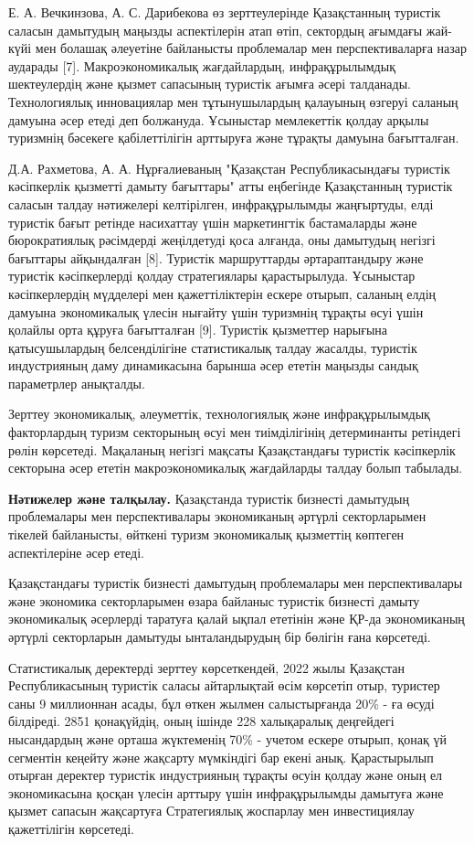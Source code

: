 Е. А. Вечкинзова, А. С. Дарибекова өз зерттеулерінде Қазақстанның
туристік саласын дамытудың маңызды аспектілерін атап өтіп, сектордың
ағымдағы жай-күйі мен болашақ әлеуетіне байланысты проблемалар мен
перспективаларға назар аударады {[}7{]}. Макроэкономикалық жағдайлардың,
инфрақұрылымдық шектеулердің және қызмет сапасының туристік ағымға әсері
талданады. Технологиялық инновациялар мен тұтынушылардың қалауының
өзгеруі саланың дамуына әсер етеді деп болжануда. Ұсыныстар мемлекеттік
қолдау арқылы туризмнің бәсекеге қабілеттілігін арттыруға және тұрақты
дамуына бағытталған.

Д.А. Рахметова, А. А. Нұрғалиеваның "Қазақстан Республикасындағы
туристік кәсіпкерлік қызметті дамыту бағыттары" атты еңбегінде
Қазақстанның туристік саласын талдау нәтижелері келтірілген,
инфрақұрылымды жаңғыртуды, елді туристік бағыт ретінде насихаттау үшін
маркетингтік бастамаларды және бюрократиялық рәсімдерді жеңілдетуді қоса
алғанда, оны дамытудың негізгі бағыттары айқындалған {[}8{]}. Туристік
маршруттарды әртараптандыру және туристік кәсіпкерлерді қолдау
стратегиялары қарастырылуда. Ұсыныстар кәсіпкерлердің мүдделері мен
қажеттіліктерін ескере отырып, саланың елдің дамуына экономикалық үлесін
нығайту үшін туризмнің тұрақты өсуі үшін қолайлы орта құруға бағытталған
{[}9{]}. Туристік қызметтер нарығына қатысушылардың белсенділігіне
статистикалық талдау жасалды, туристік индустрияның даму динамикасына
барынша әсер ететін маңызды сандық параметрлер анықталды.

Зерттеу экономикалық, әлеуметтік, технологиялық және инфрақұрылымдық
факторлардың туризм секторының өсуі мен тиімділігінің детерминанты
ретіндегі рөлін көрсетеді. Мақаланың негізгі мақсаты Қазақстандағы
туристік кәсіпкерлік секторына әсер ететін макроэкономикалық жағдайларды
талдау болып табылады.

{\bfseries Нәтижелер және талқылау.} Қазақстанда туристік бизнесті
дамытудың проблемалары мен перспективалары экономиканың әртүрлі
секторларымен тікелей байланысты, өйткені туризм экономикалық қызметтің
көптеген аспектілеріне әсер етеді.

Қазақстандағы туристік бизнесті дамытудың проблемалары мен
перспективалары және экономика секторларымен өзара байланыс туристік
бизнесті дамыту экономикалық әсерлерді таратуға қалай ықпал ететінін
және ҚР-да экономиканың әртүрлі секторларын дамытуды ынталандырудың бір
бөлігін ғана көрсетеді.

Статистикалық деректерді зерттеу көрсеткендей, 2022 жылы Қазақстан
Республикасының туристік саласы айтарлықтай өсім көрсетіп отыр, туристер
саны 9 миллионнан асады, бұл өткен жылмен салыстырғанда 20\% - ға өсуді
білдіреді. 2851 қонақүйдің, оның ішінде 228 халықаралық деңгейдегі
нысандардың және орташа жүктеменің 70\% - учетом ескере отырып, қонақ үй
сегментін кеңейту және жақсарту мүмкіндігі бар екені анық. Қарастырылып
отырған деректер туристік индустрияның тұрақты өсуін қолдау және оның ел
экономикасына қосқан үлесін арттыру үшін инфрақұрылымды дамытуға және
қызмет сапасын жақсартуға Стратегиялық жоспарлау мен инвестициялау
қажеттілігін көрсетеді.

